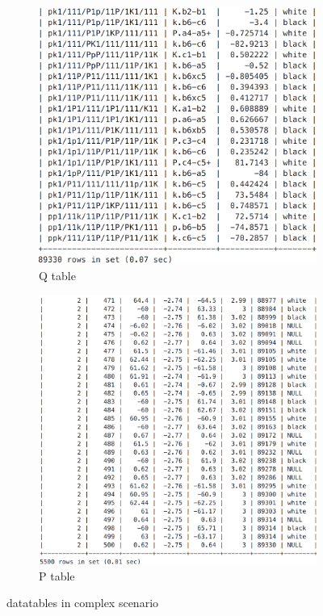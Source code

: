 \documentclass{article}
\begin{document}
				\begin{figure}[h!]
		\centering
        \begin{subfigure}{0.48\textwidth}
                \includegraphics[width=\linewidth]{complex_qtable}
                \caption{Q table}
        \end{subfigure}\qquad
        \begin{subfigure}{0.46\textwidth}
                \includegraphics[width=\linewidth]{complex_ptable}
                \caption{P table}
        \end{subfigure}\qquad
        \caption{datatables in complex scenario}
 		\label{fig:11}
 		\end{figure}
\end{document}
